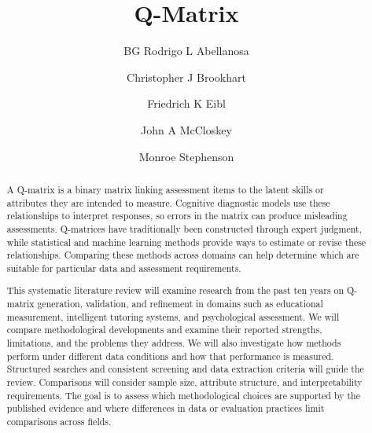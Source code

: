 \documentclass[sigconf]{acmart}
\begin{document}
\title{Q-Matrix}

\author{BG Rodrigo L Abellanosa}

\author{Christopher J Brookhart}

\author{Friedrich K Eibl}

\author{John A McCloskey}

\author{Monroe Stephenson}


\renewcommand{\shortauthors}{Abellanosa et al.}

\begin{abstract}
A Q-matrix is a binary matrix linking assessment items to the latent skills or attributes they are intended to measure. Cognitive diagnostic models use these relationships to interpret responses, so errors in the matrix can produce misleading assessments. Q-matrices have traditionally been constructed through expert judgment, while statistical and machine learning methods provide ways to estimate or revise these relationships. Comparing these methods across domains can help determine which are suitable for particular data and assessment requirements.

This systematic literature review will examine research from the past ten years on Q-matrix generation, validation, and refinement in domains such as educational measurement, intelligent tutoring systems, and psychological assessment. We will compare methodological developments and examine their reported strengths, limitations, and the problems they address. We will also investigate how methods perform under different data conditions and how that performance is measured. Structured searches and consistent screening and data extraction criteria will guide the review. Comparisons will consider sample size, attribute structure, and interpretability requirements. The goal is to assess which methodological choices are supported by the published evidence and where differences in data or evaluation practices limit comparisons across fields.

\end{abstract}
\end{document}
